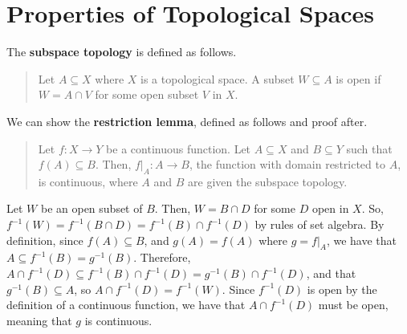 \documentclass[12pt]{extarticle}
\begin{document}
\section*{Properties of Topological Spaces}%
The \textbf{subspace topology} is defined as follows.
  \begin{quote}
    Let $A\subseteq X$ where $X$ is a topological space. A subset $W\subseteq A$ is open if $W = A\cap V$ for some open subset $V$ in $X$.
  \end{quote}
We can show the \textbf{restriction lemma}, defined as follows and proof after.
  \begin{quote}
    Let $f:X\rightarrow Y$ be a continuous function. Let $A\subseteq X$ and $B\subseteq Y$ such that $f(A)\subseteq B$. Then, $f\vert_{A}: A\rightarrow B$, the function with domain restricted to $A$, is continuous, where $A$ and $B$ are given the subspace topology.
  \end{quote}
  Let $W$ be an open subset of $B$. Then, $W = B\cap D$ for some $D$ open in $X$. So, $f^{-1}(W) = f^{-1}(B\cap D) = f^{-1}(B)\cap f^{-1}(D)$ by rules of set algebra. By definition, since $f(A)\subseteq B$, and $g(A) = f(A)$ where $g = f\vert_{A}$, we have that $A\subseteq f^{-1}(B) = g^{-1}(B)$. Therefore, $A\cap f^{-1}(D)\subseteq f^{-1}(B)\cap f^{-1}(D) = g^{-1}(B)\cap f^{-1}(D)$, and that $g^{-1}(B) \subseteq A$, so $A\cap f^{-1}(D) = f^{-1}(W)$. Since $f^{-1}(D)$ is open by the definition of a continuous function, we have that $A\cap f^{-1}(D)$ must be open, meaning that $g$ is continuous.
\end{document}
